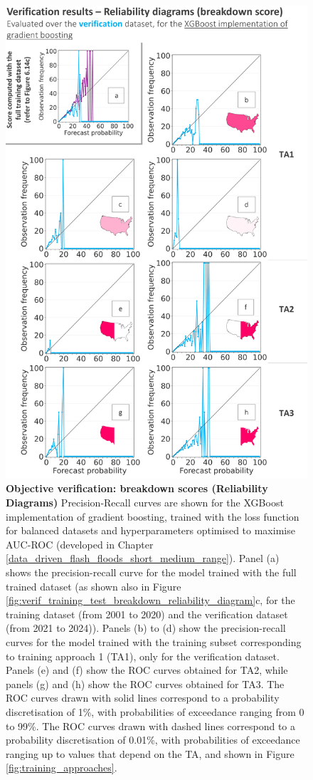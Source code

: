 \begin{figure}[htbp]
\centering
\includegraphics[scale = 0.95]{verif_breakdown_scores_reliability_diagram.png}
\caption{\textbf{Objective verification: breakdown scores (Reliability Diagrams)} Precision-Recall curves are shown for the XGBoost implementation of gradient boosting, trained with the loss function for balanced datasets and hyperparameters optimised to maximise AUC-ROC (developed in Chapter \ref{data_driven_flash_floods_short_medium_range}). Panel (a) shows the precision-recall curve for the model trained with the full trained dataset (as shown also in Figure \ref{fig:verif_training_test_breakdown_reliability_diagram}c, for the \textcolor{colourTraining}{training} dataset (from 2001 to 2020) and the \textcolor{colourTest}{verification} dataset (from 2021 to 2024)). Panels (b) to (d) show the precision-recall curves for the model trained with the training subset corresponding to training approach 1 (TA1), only for the \textcolor{colourTest}{verification} dataset. Panels (e) and (f) show the ROC curves obtained for TA2, while panels (g) and (h) show the ROC curves obtained for TA3. The ROC curves drawn with solid lines correspond to a probability discretisation of 1\%, with probabilities of exceedance ranging from 0 to 99\%. The ROC curves drawn with dashed lines correspond to a probability discretisation of 0.01\%, with probabilities of exceedance ranging up to values that depend on the TA, and shown in Figure \ref{fig:training_approaches}.}

\end{figure}

